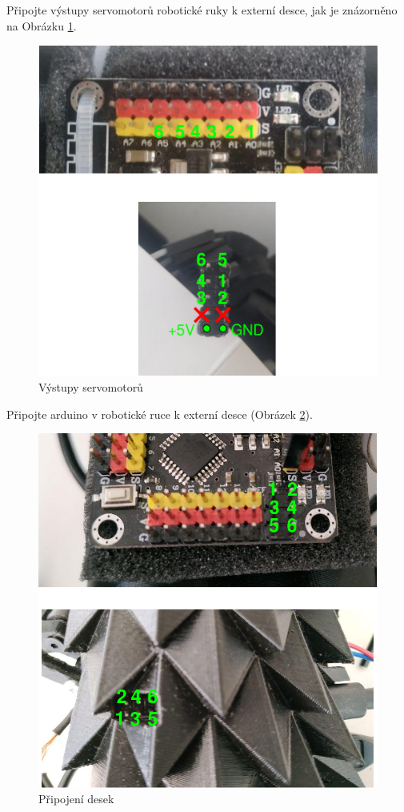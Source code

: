 \documentclass[thesis=B,czech]{FITthesis}[2012/06/26]
\begin{document}
Připojte výstupy servomotorů robotické ruky k externí desce, jak je znázorněno na Obrázku \ref{fig:Instr1}.
 
 \begin{figure}[H]
\centering
\includegraphics[scale=0.28]{./image/inst0.png}
\caption{Výstupy servomotorů}
\label{fig:Instr1}
\end{figure} 
 
\newpage
 
Připojte arduino v robotické ruce k externí desce (Obrázek \ref{fig:Instr2}).

 \begin{figure}[H]
\centering
\includegraphics[scale=0.35]{./image/inst1.png}
\caption{Připojení desek}
\label{fig:Instr2}
\end{figure} 
\end{document}
